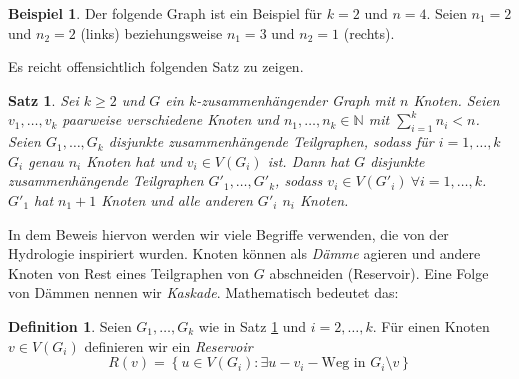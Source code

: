 \documentclass[12pt,a4paper]{scrartcl}
\numberwithin{equation}{section} %
\theoremstyle{definition}
\newtheorem{defn}[auf]{Definition}
\newtheorem{bsp}[auf]{Beispiel}
\theoremstyle{plain}
\newtheorem{sa}[auf]{Satz}
\newcommand{\nn}{\mathbb{N}}
\begin{document}
\begin{bsp}
    Der folgende Graph ist ein Beispiel für $k=2$ und $n=4$. Seien $n_1=2$ und $n_2=2$ (links) beziehungsweise $n_1=3$ und $n_2=1$ (rechts).
    \begin{figure}[h]
        \centering
{}
\end{figure}
\end{bsp}
Es reicht offensichtlich folgenden Satz zu zeigen.
\begin{sa}
Sei $k\ge 2$ und $G$ ein $k$-zusammenhängender Graph mit $n$ Knoten. Seien $v_1,\dotsc,v_k$ paarweise verschiedene Knoten und $n_1,\dotsc,n_k\in\nn$ mit $\sum_{i=1}^kn_i<n$. Seien $G_1,\dotsc,G_k$ disjunkte zusammenhängende Teilgraphen, sodass für $i=1,\dotsc,k$ $G_i$ genau $n_i$ Knoten hat und $v_i\in V(G_i)$ ist. Dann hat $G$ disjunkte zusammenhängende Teilgraphen $G'_1,\dotsc,G'_k$, sodass $v_i\in V(G'_i)~\forall i=1,\dotsc,k$. $G'_1$ hat $n_1+1$ Knoten und alle anderen $G'_i$ $n_i$ Knoten.
\label{sa:2}
\end{sa}
In dem Beweis hiervon werden wir viele Begriffe verwenden, die von der Hydrologie inspiriert wurden. Knoten können als \emph{Dämme} agieren und andere Knoten von Rest eines Teilgraphen von $G$ abschneiden (Reservoir). Eine Folge von Dämmen nennen wir \emph{Kaskade}. Mathematisch bedeutet das:
\begin{defn}
Seien $G_1,\dotsc, G_k$ wie in Satz \ref{sa:2} und $i=2,\dotsc,k$. Für einen Knoten $v\in V(G_i)$ definieren wir ein \emph{Reservoir} 
\[R(v)=\left\lbrace u\in V(G_i)\colon \exists u-v_i-\text{Weg in }G_i\setminus v\right\rbrace\] 
\end{defn}
\end{document}
